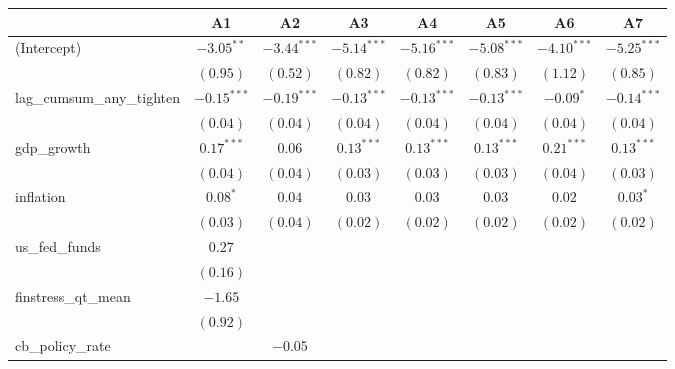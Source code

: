 
\begin{tabular}{l c c c c c c c }
\hline
 & A1 & A2 & A3 & A4 & A5 & A6 & A7 \\
\hline
(Intercept)                      & $-3.05^{**}$  & $-3.44^{***}$ & $-5.14^{***}$ & $-5.16^{***}$ & $-5.08^{***}$ & $-4.10^{***}$ & $-5.25^{***}$ \\
                                 & $(0.95)$      & $(0.52)$      & $(0.82)$      & $(0.82)$      & $(0.83)$      & $(1.12)$      & $(0.85)$      \\
lag\_cumsum\_any\_tighten        & $-0.15^{***}$ & $-0.19^{***}$ & $-0.13^{***}$ & $-0.13^{***}$ & $-0.13^{***}$ & $-0.09^{*}$   & $-0.14^{***}$ \\
                                 & $(0.04)$      & $(0.04)$      & $(0.04)$      & $(0.04)$      & $(0.04)$      & $(0.04)$      & $(0.04)$      \\
gdp\_growth                      & $0.17^{***}$  & $0.06$        & $0.13^{***}$  & $0.13^{***}$  & $0.13^{***}$  & $0.21^{***}$  & $0.13^{***}$  \\
                                 & $(0.04)$      & $(0.04)$      & $(0.03)$      & $(0.03)$      & $(0.03)$      & $(0.04)$      & $(0.03)$      \\
inflation                        & $0.08^{*}$    & $0.04$        & $0.03$        & $0.03$        & $0.03$        & $0.02$        & $0.03^{*}$    \\
                                 & $(0.03)$      & $(0.04)$      & $(0.02)$      & $(0.02)$      & $(0.02)$      & $(0.02)$      & $(0.02)$      \\
us\_fed\_funds                   & $0.27$        &               &               &               &               &               &               \\
                                 & $(0.16)$      &               &               &               &               &               &               \\
finstress\_qt\_mean              & $-1.65$       &               &               &               &               &               &               \\
                                 & $(0.92)$      &               &               &               &               &               &               \\
cb\_policy\_rate                 &               & $-0.05$       &               &               &               &               &               \\

\end{tabular}

